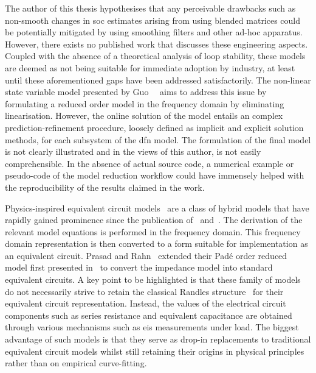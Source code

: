 The author  of this thesis hypothesises  that any perceivable drawbacks  such as
non-smooth changes  in \gls{soc} estimates  arising from using  blended matrices
could  be potentially  mitigated by  using  smoothing filters  and other  ad-hoc
apparatus.  However,  there  exists  no  published  work  that  discusses  these
engineering aspects. Coupled with the absence  of a theoretical analysis of loop
stability,  these  models  are  deemed  as  not  being  suitable  for  immediate
adoption  by  industry, at  least  until  these  aforementioned gaps  have  been
addressed  satisfactorily.  The non-linear  state  variable  model presented  by
Guo~\etal{}~\cite{Guo2017} aims to  address this issue by  formulating a reduced
order model in  the frequency domain by eliminating  linearisation. However, the
online solution of the model entails an complex prediction-refinement procedure,
loosely defined as implicit and explicit solution methods, for each subsystem of
the  \gls{dfn}  model.  The  formulation  of the  final  model  is  not  clearly
illustrated and  in the views of  this author, is not  easily comprehensible. In
the absence  of actual source  code, a numerical  example or pseudo-code  of the
model reduction workflow could have immensely helped with the reproducibility of
the results claimed in the work.


Physics-inspired                        equivalent                       circuit
models~\cite{Prasad2012,Prasad2014,Zhang2017,Cheng2017,Merla2018} are a class of
hybrid  models  that  have  rapidly  gained  prominence  since  the  publication
of~\cite{Jokar2016}  and~\cite{Fan2015}. The  derivation of  the relevant  model
equations  is  performed   in  the  frequency  domain.   This  frequency  domain
representation is  then converted to  a form  suitable for implementation  as an
equivalent circuit. Prasad and Rahn~\cite{Prasad2014} extended their Padé order
reduced  model first  presented  in~\cite{Prasad2013} to  convert the  impedance
model into standard  equivalent circuits. A key point to  be highlighted is that
these family of models do not necessarily strive to retain the classical Randles
structure~\cite{Randles1947}  for   their  equivalent   circuit  representation.
Instead,  the  values  of  the  electrical circuit  components  such  as  series
resistance and  equivalent capacitance  are obtained through  various mechanisms
such as \gls{eis} measurements under load.  The biggest advantage of such models
is that  they serve  as drop-in replacements  to traditional  equivalent circuit
models whilst still  retaining their origins in physical  principles rather than
on empirical curve-fitting.


